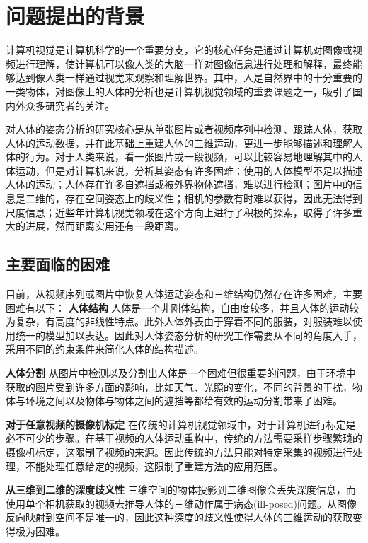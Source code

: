 \section{问题提出的背景}



计算机视觉是计算机科学的一个重要分支，它的核心任务是通过计算机对图像或视频进行理解，使计算机可以像人类的大脑一样对图像信息进行处理和解释，最终能够达到像人类一样通过视觉来观察和理解世界。其中，人是自然界中的十分重要的一类物体，对图像上的人体的分析也是计算机视觉领域的重要课题之一，吸引了国内外众多研究者的关注。

对人体的姿态分析的研究核心是从单张图片或者视频序列中检测、跟踪人体，获取人体的运动数据，并在此基础上重建人体的三维运动，更进一步能够描述和理解人体的行为。对于人类来说，看一张图片或一段视频，可以比较容易地理解其中的人体运动，但是对计算机来说，分析其姿态有许多困难：使用的人体模型不足以描述人体的运动；人体存在许多自遮挡或被外界物体遮挡，难以进行检测；图片中的信息是二维的，存在空间姿态上的歧义性；相机的参数有时难以获得，因此无法得到尺度信息；近些年计算机视觉领域在这个方向上进行了积极的探索，取得了许多重大的进展，然而距离实用还有一段距离。

\subsection{主要面临的困难}
目前，从视频序列或图片中恢复人体运动姿态和三维结构仍然存在许多困难，主要困难有以下：
\textbf{人体结构}
人体是一个非刚体结构，自由度较多，并且人体的运动较为复杂，有高度的非线性特点。此外人体外表由于穿着不同的服装，对服装难以使用统一的模型加以表达。因此对人体姿态分析的研究工作需要从不同的角度入手，采用不同的约束条件来简化人体的结构描述。

\textbf{人体分割}
从图片中检测以及分割出人体是一个困难但很重要的问题，由于环境中获取的图片受到许多方面的影响，比如天气、光照的变化，不同的背景的干扰，物体与环境之间以及物体与物体之间的遮挡等都给有效的运动分割带来了困难。

\textbf{对于任意视频的摄像机标定}
在传统的计算机视觉领域中，对于计算机进行标定是必不可少的步骤。在基于视频的人体运动重构中，传统的方法需要采样步骤繁琐的摄像机标定，这限制了视频的来源。因此传统的方法只能对特定采集的视频进行处理，不能处理任意给定的视频，这限制了重建方法的应用范围。

\textbf{从三维到二维的深度歧义性}
三维空间的物体投影到二维图像会丢失深度信息，而使用单个相机获取的视频去推导人体的三维动作属于病态(ill-posed)问题。从图像反向映射到空间不是唯一的，因此这种深度的歧义性使得人体的三维运动的获取变得极为困难。
